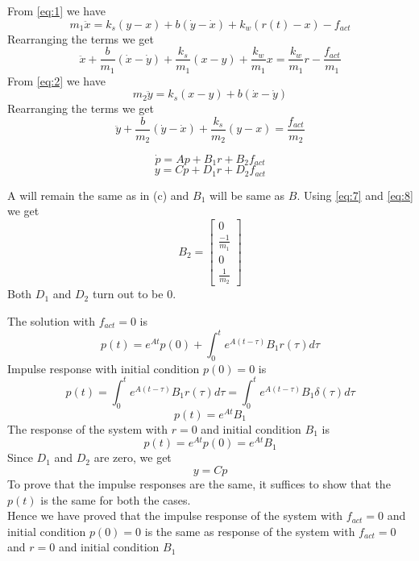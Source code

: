 \documentclass{article}
\newenvironment{answer}[2][Answer]{\begin{trivlist}
  \item[\hskip \labelsep {\bfseries #1}\hskip \labelsep {\bfseries #2:}]}{\end{trivlist}}
\begin{document}
\begin{answer}e
  From \ref{eq:1} we have
  $$m_1\ddot{x} = k_s(y-x) + b(\dot{y} - \dot{x}) + k_w(r(t) - x) - f_{act}$$
  Rearranging the terms we get
  \begin{equation}
    \label{eq:7}
    \ddot{x} + \frac{b}{m_1}(\dot{x} - \dot{y}) + \frac{k_s}{m_1}(x - y) + \frac{k_w}{m_1}x = \frac{k_w}{m_1}r - \frac{f_{act}}{m_1}
  \end{equation}
  From \ref{eq:2} we have
  $$m_2\ddot{y} = k_s(x-y) + b(\dot{x} - \dot{y})$$
  Rearranging the terms we get
  \begin{equation}
    \label{eq:8}
    \ddot{y} + \frac{b}{m_2}(\dot{y} - \dot{x}) + \frac{k_s}{m_2}(y - x) = \frac{f_{act}}{m_2}
  \end{equation}

\end{answer}
\begin{answer}f
  $$\dot{p} = Ap + B_1r + B_2f_{act}$$
  $$ y = Cp + D_1r + D_2f_{act}$$

  A will remain the same as in (c) and $B_1$ will be same as $B$.
  Using \ref{eq:7} and \ref{eq:8} we get
  \[
    B_2 =
    \begin{bmatrix}
      0\\
      \frac{-1}{m_1}\\
      0\\
      \frac{1}{m_2}
    \end{bmatrix}
  \]
  Both $D_1$ and $D_2$ turn out to be 0.  
\end{answer}
\begin{answer}g
  The solution with $f_{act} = 0$ is
  $$p(t) = e^{At}p(0) + \int_0^t e^{A(t-\tau)}B_1r(\tau)d\tau$$
  Impulse response with initial condition $p(0) = 0$ is
  $$p(t) = \int_0^t e^{A(t-\tau)}B_1r(\tau)d\tau = \int_0^t e^{A(t-\tau)}B_1\delta(\tau)d\tau$$
  $$p(t) = e^{At}B_1$$
  The response of the system with $r = 0$ and initial condition $B_1$ is
  $$p(t) = e^{At}p(0) = e^{At}B_1$$
  Since $D_1$ and $D_2$ are zero, we get
  $$y = Cp$$
  To prove that the impulse responses are the same, it suffices to show that the $p(t)$ is the same for both the cases. \\
  Hence we have proved that the impulse response of the system with $f_{act} = 0$ and initial condition $p(0)=0$ is the same as response of the system with $f_{act} = 0$ and $r=0$ and initial condition $B_1$
\end{answer}
\end{document}
